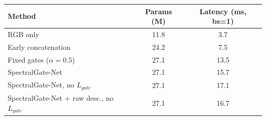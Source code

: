 \begin{tabular}{lcc}
\toprule
Method & Params (M) & Latency (ms, bs=1) \\
\midrule
RGB only & 11.8 & 3.7 \\
Early concatenation & 24.2 & 7.5 \\
Fixed gates ($\alpha=0.5$) & 27.1 & 13.5 \\
SpectralGate-Net & 27.1 & 15.7 \\
SpectralGate-Net, no $L_{gate}$ & 27.1 & 17.1 \\
SpectralGate-Net + raw desc., no $L_{gate}$ & 27.1 & 16.7 \\
\bottomrule
\end{tabular}